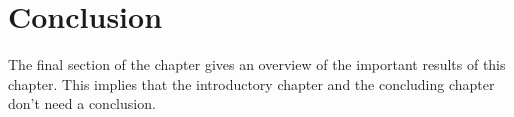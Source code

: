 \section{Conclusion}
\label{cha:3:Conclusion}
The final section of the chapter gives an overview of the important results
of this chapter. This implies that the introductory chapter and the
concluding chapter don't need a conclusion.


